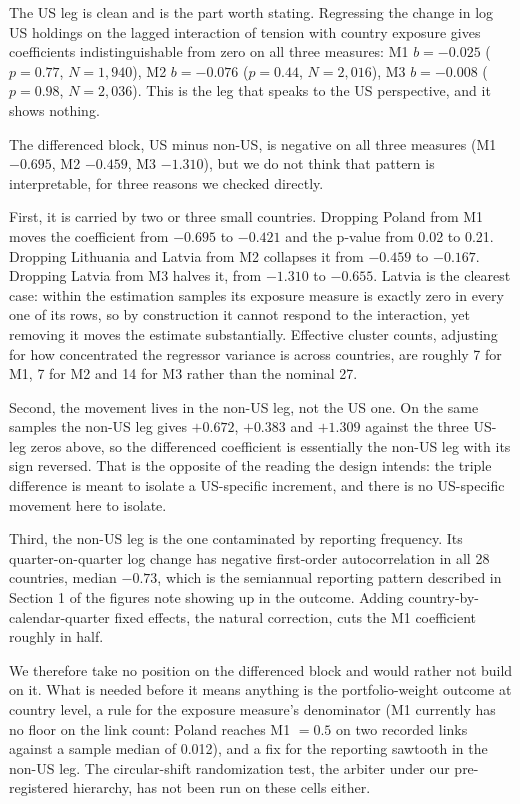 \documentclass[11pt]{article}
\begin{document}
The US leg is clean and is the part worth stating. Regressing the change in
log US holdings on the lagged interaction of tension with country exposure
gives coefficients indistinguishable from zero on all three measures: M1
$b = -0.025$ ($p = 0.77$, $N = 1{,}940$), M2 $b = -0.076$ ($p = 0.44$,
$N = 2{,}016$), M3 $b = -0.008$ ($p = 0.98$, $N = 2{,}036$). This is the leg
that speaks to the US perspective, and it shows nothing.

The differenced block, US minus non-US, is negative on all three measures
(M1 $-0.695$, M2 $-0.459$, M3 $-1.310$), but we do not think that pattern is
interpretable, for three reasons we checked directly.

First, it is carried by two or three small countries. Dropping Poland from M1
moves the coefficient from $-0.695$ to $-0.421$ and the p-value from 0.02 to
0.21. Dropping Lithuania and Latvia from M2 collapses it from $-0.459$ to
$-0.167$. Dropping Latvia from M3 halves it, from $-1.310$ to $-0.655$. Latvia
is the clearest case: within the estimation samples its exposure measure is
exactly zero in every one of its rows, so by construction it cannot respond to
the interaction, yet removing it moves the estimate substantially. Effective
cluster counts, adjusting for how concentrated the regressor variance is
across countries, are roughly 7 for M1, 7 for M2 and 14 for M3 rather than the
nominal 27.

Second, the movement lives in the non-US leg, not the US one. On the same
samples the non-US leg gives $+0.672$, $+0.383$ and $+1.309$ against the three
US-leg zeros above, so the differenced coefficient is essentially the non-US
leg with its sign reversed. That is the opposite of the reading the design
intends: the triple difference is meant to isolate a US-specific increment,
and there is no US-specific movement here to isolate.

Third, the non-US leg is the one contaminated by reporting frequency. Its
quarter-on-quarter log change has negative first-order autocorrelation in all
28 countries, median $-0.73$, which is the semiannual reporting pattern
described in Section 1 of the figures note showing up in the outcome. Adding
country-by-calendar-quarter fixed effects, the natural correction, cuts the M1
coefficient roughly in half.

We therefore take no position on the differenced block and would rather not
build on it. What is needed before it means anything is the portfolio-weight
outcome at country level, a rule for the exposure measure's denominator (M1
currently has no floor on the link count: Poland reaches M1 $= 0.5$ on two
recorded links against a sample median of 0.012), and a fix for the reporting
sawtooth in the non-US leg. The circular-shift randomization test, the arbiter
under our pre-registered hierarchy, has not been run on these cells either.
\end{document}
